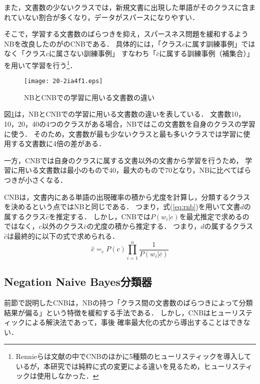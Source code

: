 \documentclass[japanese]{jnlp_1.4}
\newcommand{\argmax}{}
\begin{document}
また，文書数の少ないクラスでは，新規文書に出現した単語がそのクラスに含まれていない割合が多くなり，データがスパースになりやすい．

そこで，学習する文書数のばらつきを抑え，スパースネス問題を緩和するようNBを改良したのがのCNBである．
具体的には，「クラス$c$に属す訓練事例」ではなく「クラス$c$に属さない訓練事例」
すなわち「$\bar{c}$に属する訓練事例（補集合）」を用いて学習を行う\footnote{Rennieらは文献の中でCNBのほかに5種類のヒューリスティックを導入しているが，本研究では純粋に式の変更による違いを見るため，ヒューリスティックは使用しなかった．}．

\begin{figure}[b]
\begin{center}
\texttt{[image: 20-2ia4f1.eps]}
\end{center}
\caption{NBとCNBでの学習に用いる文書数の違い}
\label{Fig:コンプ文書数変化}
\end{figure}

図\ref{Fig:コンプ文書数変化}は，NBとCNBでの学習に用いる文書数の違いを表している．
文書数10，10，20，40の4つのクラスがある場合，NBではこの文書数を自身のクラスの学習に使う．
そのため，文書数が最も少ないクラスと最も多いクラスでは学習に使用する文書数に4倍の差がある．

一方，CNBでは自身のクラスに属する文書以外の文書から学習を行うため，
学習に用いる文書数は最小のもので40，最大のもので70となり，NBに比べてばらつきが小さくなる．

CNBは，文書内にある単語の出現確率の積から尤度を計算し，分類するクラスを決めるという点ではNBと同じである．
つまり，式(\ref{eq:rnb})を用いて文書$d$の属するクラス$\hat{c}$を推定する．
しかし，CNBでは$P(w_i|c)$を最尤推定で求めるのではなく，$c$以外のクラス$\bar{c}$の尤度の積から推定する．
つまり，$d$の属するクラス$\hat{c}$は最終的に以下の式で求められる．
\begin{equation}
\hat{c}=\argmax_{c} P(c) \prod_{i=1}^{n} \frac{1}{P(w_i|\bar{c})} \label{eq:cnb}
\end{equation}


\subsection{Negation Naive Bayes分類器}
\label{Sec:Negation Naive Bayes分類器}

前節で説明したCNBは，NBの持つ「クラス間の文書数のばらつきによって分類結果が偏る」という特徴を緩和する手法である．
しかし，CNBはヒューリスティックによる解決法であって，事後
確率最大化の式から導出することはできない．
\end{document}
